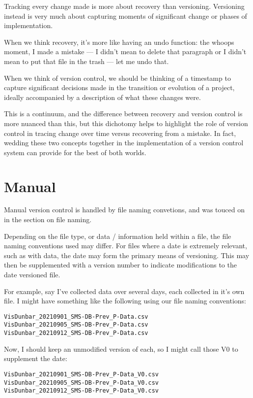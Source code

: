\documentclass[
]{book}
\begin{document}
Tracking every change made is more about recovery than versioning. Versioning instead is very much about capturing moments of significant change or phases of implementation.

When we think recovery, it's more like having an undo function: the whoops moment, I made a mistake --- I didn't mean to delete that paragraph or I didn't mean to put that file in the trash --- let me undo that.

When we think of version control, we should be thinking of a timestamp to capture significant decisions made in the transition or evolution of a project, ideally accompanied by a description of what these changes were.

This is a continuum, and the difference between recovery and version control is more nuanced than this, but this dichotomy helps to highlight the role of version control in tracing change over time versus recovering from a mistake. In fact, wedding these two concepts together in the implementation of a version control system can provide for the best of both worlds.

\hypertarget{manual}{%
\section*{Manual}\label{manual}}

Manual version control is handled by file naming convetions, and was touced on in the section on file naming.

Depending on the file type, or data / information held within a file, the file naming conventions used may differ. For files where a date is extremely relevant, such as with data, the date may form the primary means of versioning. This may then be supplemented with a version number to indicate modifications to the date versioned file.

For example, say I've collected data over several days, each collected in it's own file. I might have something like the following using our file naming conventions:

\begin{verbatim}
VisDunbar_20210901_SMS-DB-Prev_P-Data.csv
VisDunbar_20210905_SMS-DB-Prev_P-Data.csv
VisDunbar_20210912_SMS-DB-Prev_P-Data.csv
\end{verbatim}

Now, I should keep an unmodified version of each, so I might call those V0 to supplement the date:

\begin{verbatim}
VisDunbar_20210901_SMS-DB-Prev_P-Data_V0.csv
VisDunbar_20210905_SMS-DB-Prev_P-Data_V0.csv
VisDunbar_20210912_SMS-DB-Prev_P-Data_V0.csv
\end{verbatim}
\end{document}
